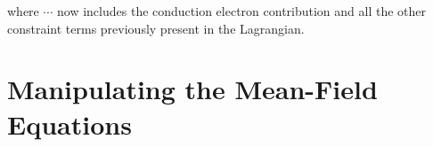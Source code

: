 where $ \cdots $ now includes the conduction electron contribution and all the other constraint terms previously present in the Lagrangian.



\section{Manipulating the Mean-Field Equations}
